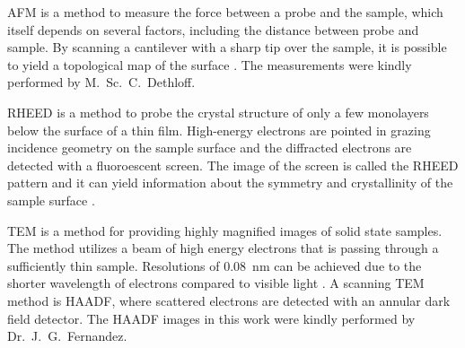 \acrfull{AFM} is a method to measure the force between a probe and the sample, which itself depends on several factors, including the distance between probe and sample.
By scanning a cantilever with a sharp tip over the sample, it is possible to yield a topological map of the surface
    \cite{schroder2005}.
The measurements were kindly performed by M.\ Sc.\ C.\ Dethloff.

\acrfull{RHEED} is a method to probe the crystal structure of only a few monolayers below the surface of a thin film.
High-energy electrons are pointed in grazing incidence geometry on the sample surface and the diffracted electrons are detected with a fluoroescent screen.
The image of the screen is called the RHEED pattern and it can yield information about the symmetry and crystallinity of the sample surface
    \cite{hafez2022}.

\acrfull{TEM} is a method for providing highly magnified images of solid state samples.
The method utilizes a beam of high energy electrons that is passing through a sufficiently thin sample.
Resolutions of \qty{0.08}{\nm} can be achieved due to the shorter wavelength of electrons compared to visible light
    \cite{schroder2005}.
A scanning \acrshort{TEM} method is \gls{HAADF}, where scattered electrons are detected with an annular dark field detector.
The \acrshort{HAADF} images in this work were kindly performed by Dr.\ J.\ G.\  Fernandez.